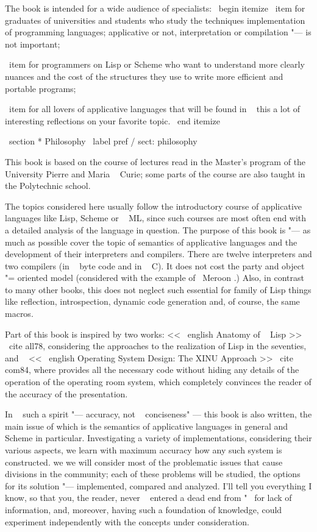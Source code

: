 The book is intended for a wide audience of specialists:
\ begin {itemize}
  \ item for graduates of universities and students who study the techniques
        implementation of programming languages; applicative or not,
        interpretation or compilation "--- is not important;

  \ item for programmers on Lisp or Scheme who want to understand more clearly
        nuances and the cost of the structures they use to write
        more efficient and portable programs;

  \ item for all lovers of applicative languages ​​that will be found in ~ this
        a lot of interesting reflections on your favorite topic.
\ end {itemize}


\ section * {Philosophy} \ label {pref / sect: philosophy}

This book is based on the course of lectures read in the Master's program of the University
Pierre and Maria ~ Curie; some parts of the course are also taught in the Polytechnic
school.

The topics considered here usually follow the introductory course of applicative
languages ​​like Lisp, Scheme or ~ ML, since such courses are most often
end with a detailed analysis of the language in question. The purpose of this book is "---
as much as possible cover the topic of semantics of applicative languages ​​and the development of their
interpreters and compilers. There are twelve interpreters and
two compilers (in ~ byte code and in ~ C). It does not cost the party and
object "= oriented model (considered with the example of \ Meroon .) Also,
in contrast to many other books, this does not neglect such essential for
family of Lisp things like reflection, introspection, dynamic code generation
and, of course, the same macros.

Part of this book is inspired by two works: << \ english {Anatomy of ~ Lisp} >>
\ cite {all78}, considering the approaches to the realization of Lisp in the seventies,
and ~ << \ english {Operating System Design: The XINU Approach} >> \ cite {com84}, where
provides all the necessary code without hiding any details of the operation of the operating room
system, which completely convinces the reader of the accuracy of the presentation.

In ~ such a spirit "--- accuracy, not ~ conciseness" --- this book is also written,
the main issue of which is the semantics of applicative languages ​​in general and Scheme
in particular. Investigating a variety of implementations, considering their various aspects,
we learn with maximum accuracy how any such system is constructed. we
we will consider most of the problematic issues that cause divisions in the community;
each of these problems will be studied, the options for its solution "--- implemented,
compared and analyzed. I'll tell you everything I know, so that you, the reader,
never ~ entered a dead end from "~ for lack of information, and, moreover, having
such a foundation of knowledge, could experiment independently
with the concepts under consideration.


